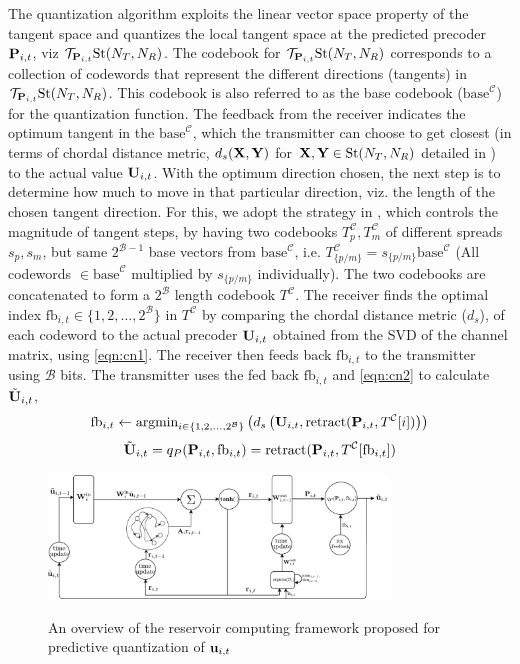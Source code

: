 \documentclass[conference]{IEEEtran}
\begin{document}
The quantization algorithm exploits the linear vector space property of the tangent space and quantizes the local tangent space at the predicted precoder ${\bf P}_{i,t}$, viz $\mathcal{T}_{{\bf P}_{i,t}} \text{St}(N_T,N_R)$.
The codebook for $\mathcal{T}_{{\bf P}_{i,t}} \text{St}(N_T,N_R)$ corresponds to a collection of codewords that represent the different directions (tangents) in $\mathcal{T}_{{\bf P}_{i,t}} \text{St}(N_T,N_R)$.
This codebook is also referred to as the base codebook ($\text{base}^{\mathcal{C}}$) for the quantization function.
The feedback from the receiver indicates the optimum tangent in the $\text{base}^{\mathcal{C}}$, which the transmitter can choose to get closest (in terms of chordal distance metric, $d_s({\bf X},{\bf Y})$ for ${\bf X},{\bf Y} \in \text{St}(N_T,N_R)$ detailed in \cite{Gupt1905:Predictive,6891198}) to the actual value ${\bf U}_{i,t}$.
With the optimum direction chosen, the next step is to determine how much to move in that particular direction, viz. the length of the chosen tangent direction.
For this, we adopt the strategy in \cite{6891198}, which
controls the magnitude of tangent steps, by having two codebooks
$T^{\mathcal{C}}_p,T^{\mathcal{C}}_m$ of different spreads $s_p,s_m$, but same $2^{\mathcal{B}-1}$ base vectors from $\text{base}^{\mathcal{C}}$, i.e. $T^{\mathcal{C}}_{\{p/m\}}=s_{\{p/m\}}\text{base}^{\mathcal{C}}$ (All codewords $\in \text{base}^{\mathcal{C}}$ multiplied by $s_{\{p/m\}}$ individually).
The two codebooks are concatenated to form a $2^\mathcal{B}$ length codebook $T^\mathcal{C}$.
The receiver finds the optimal index $\text{fb}_{i,t} \in \{1,2,\ldots,2^{\mathcal{B}}\}$ in $T^\mathcal{C}$ by comparing the chordal distance metric ($d_s$), of each codeword to the actual precoder ${\bf U}_{i,t}$ obtained from the SVD of the channel matrix, using \eqref{eqn:cn1}. The receiver then feeds back $\text{fb}_{i,t}$ to the transmitter using $\mathcal{B}$ bits. The transmitter uses the fed back $\text{fb}_{i,t}$ and \eqref{eqn:cn2} to calculate $\tilde{{\bf U}}_{i,t}$,
\begin{equation}
\label{eqn:cn1}
\text{fb}_{i,t} \gets \text{argmin}_{i \in \{1,2,\ldots,2^{\mathcal{B}}\}}\left (d_s\left (\bU_{i,t},\text{retract}(\bP_{i,t},T^\mathcal{C}[i])\right ) \right)
\end{equation}
\begin{equation}
\tilde{\bU}_{i,t}=q_P(\bP_{i,t},\text{fb}_{i,t})=\text{retract}(\bP_{i,t},T^\mathcal{C}[\text{fb}_{i,t}])
\label{eqn:cn2}
\end{equation}
\begin{figure}[ht]
\centering
\includegraphics[width=0.8\textwidth]{images/system.pdf}
\label{res_overview}
\caption{An overview of the reservoir computing framework proposed for predictive quantization of ${\bf u}_{i,t}$}
\end{figure}
\end{document}
